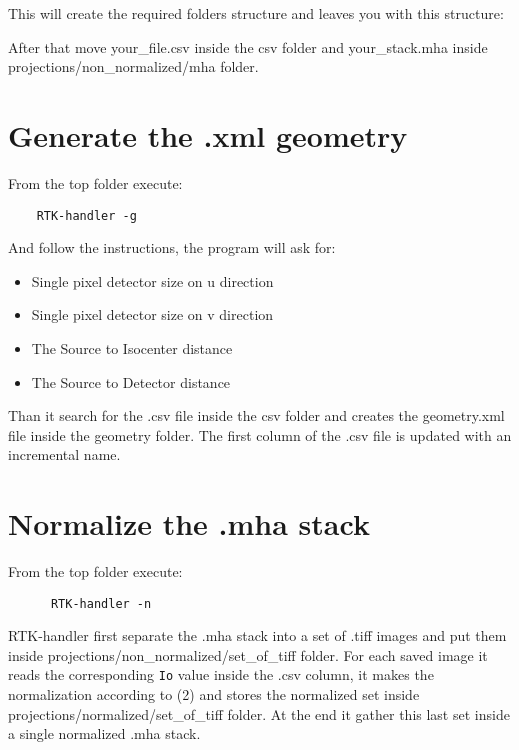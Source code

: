 \documentclass[a4paper,11pt, oneside]{article}
\begin{document}
    
  \par This will create the required folders structure and leaves you with this structure:\newline
    
    
    
    After that move your\_file.csv inside the csv folder and your\_stack.mha inside projections/non\_normalized/mha folder.
    \section{ Generate the .xml geometry }
    From the top folder execute:
    \begin{lstlisting}
    RTK-handler -g  
    \end{lstlisting}
    And follow the instructions, the program will ask for:
    \begin{itemize}
      \item Single pixel detector size on u direction
      \item Single pixel detector size on v direction
      \item The Source to Isocenter distance
      \item The Source to Detector distance
    \end{itemize}
    Than it search for the .csv file inside the csv folder and creates the geometry.xml file inside the geometry folder. The first column of the .csv file is updated with an incremental name.
    \section{ Normalize the .mha stack }
    From the top folder execute:
    \begin{lstlisting}
      RTK-handler -n
    \end{lstlisting}
    RTK-handler first separate the .mha stack into a set of .tiff images and put them inside projections/non\_normalized/set\_of\_tiff folder. For each saved image it reads the corresponding \texttt{Io} value inside the .csv column, it makes the normalization according to (2) and stores the normalized set inside projections/normalized/set\_of\_tiff folder. At the end it gather this last set inside a single normalized .mha stack.  
\end{document}
